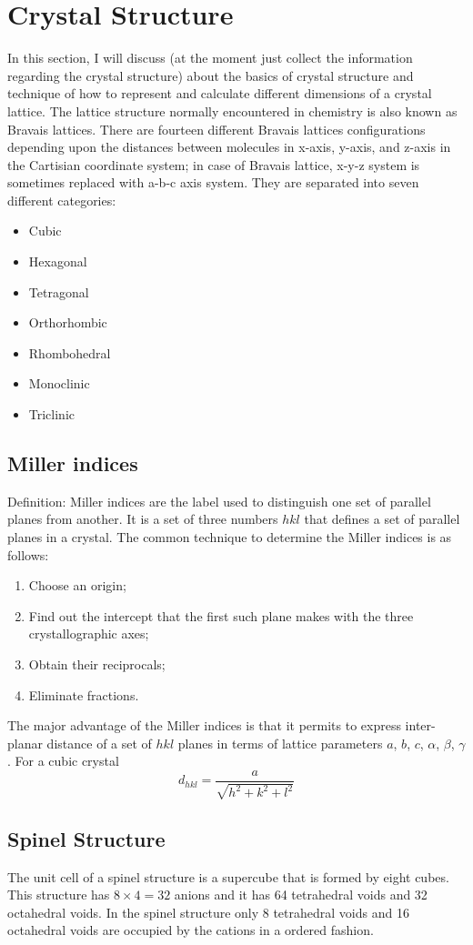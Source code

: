 \documentclass[12pt]{book}
\begin{document}
\section{Crystal Structure}
In this section, I will discuss (at the moment just collect the information regarding the crystal structure) about the basics of crystal structure and technique of how to represent and calculate different dimensions of a crystal lattice. The lattice structure normally encountered in chemistry is also known as Bravais lattices. There are fourteen different Bravais lattices configurations depending upon the distances between molecules in x-axis, y-axis, and z-axis in the Cartisian coordinate system; in case of Bravais lattice, x-y-z system is sometimes replaced with a-b-c axis system. They are separated into seven different categories:
\begin{itemize}
\item Cubic
\item Hexagonal
\item Tetragonal
\item Orthorhombic
\item Rhombohedral
\item Monoclinic
\item Triclinic
\end{itemize}
\subsection{Miller indices}

Definition: Miller indices are the label used to distinguish one set of parallel planes from another. It is a set of three numbers $hkl$ that defines a set of parallel planes in a crystal. The common technique to determine the Miller indices is as follows: 
\begin{enumerate}
	\item Choose an origin;
	\item Find out the intercept that the first such plane makes with the three
	crystallographic axes;
	\item Obtain their reciprocals;
	\item Eliminate fractions.
\end{enumerate}
The major advantage of the Miller indices is that it permits to express inter-planar distance of a set of $hkl$ planes in terms of lattice parameters $a$, $b$, $c$, $\alpha$, $\beta$, $\gamma$. For a
cubic crystal 
\[
d_{hkl}=\frac{a}{\sqrt{h^{2}+k^{2}+l^{2}}}
\]


\subsection{Spinel Structure}
The unit cell of a spinel structure is a supercube that is formed by eight cubes. This structure has $8\times4=32$ anions and it has 64 tetrahedral voids and 32 octahedral voids. In the spinel structure only 8 tetrahedral voids and 16 octahedral voids are occupied by the cations in a ordered fashion.
\end{document}
